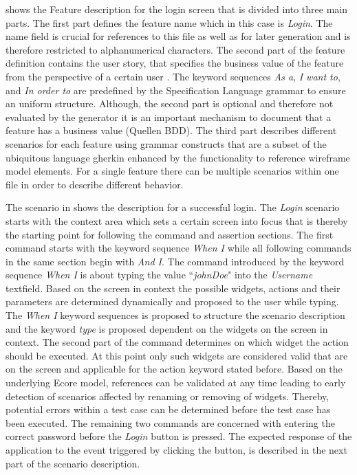 \documentclass{sig-alternate-05-2015}
\begin{document}
 shows the Feature description for the login screen that is divided into three main parts. 
The first part defines the feature name which in this case is \textit{Login}.
The name field is crucial for references to this file as well as for later generation and is therefore restricted to alphanumerical characters.
The second part of the feature definition contains the user story, that specifies the business value of the feature from the perspective of a certain user \cite{C.Solis.2011}.
The keyword sequences \textit{As a}, \textit{I want to}, and \textit{In order to} are predefined by the Specification Language grammar to ensure an uniform structure.
Although, the second part is optional and therefore not evaluated by the generator it is an important mechanism to document that a feature has a business value (Quellen BDD).
The third part describes different scenarios for each feature using grammar constructs that are a subset of the ubiquitous language gherkin enhanced by the functionality to reference wireframe model elements.
For a single feature there can be multiple scenarios within one file in order to describe different behavior.

The scenario in  shows the description for a successful login.
The \textit{Login} scenario starts with the context area which sets a certain screen into focus that is thereby the starting point for following the command and assertion sections.
The first command starts with the keyword sequence \textit{When I} while all following commands in the same section begin with \textit{And I}.
The command introduced by the keyword sequence \textit{When I} is about typing the value ``\textit{johnDoe}" into the \textit{Username} textfield. 
Based on the screen in context the possible widgets, actions and their parameters are determined dynamically and proposed to the user while typing.
The \textit{When I} keyword sequences is proposed to structure the scenario description and the keyword \textit{type} is proposed dependent on the widgets on the screen in context.
The second part of the command determines on which widget the action should be executed.
At this point only such widgets are considered valid that are on the screen and applicable for the action keyword stated before.
Based on the underlying Ecore model, references can be validated at any time leading to early detection of scenarios affected by renaming or removing of widgets.
Thereby, potential errors within a test case can be determined before the test case has been executed.
The remaining two commands are concerned with entering the correct password before the \textit{Login} button is pressed.
The expected response of the application to the event triggered by clicking the button, is described in the next part of the scenario description.
\end{document}
